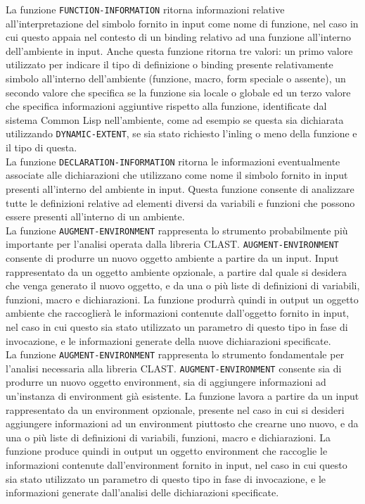 La funzione \texttt{FUNCTION-INFORMATION} ritorna informazioni relative
all’interpretazione del simbolo fornito in input come nome di funzione, nel caso
in cui questo appaia nel contesto di un binding relativo ad una funzione
all’interno dell’ambiente in input. Anche questa funzione ritorna tre valori: un
primo valore utilizzato per indicare il tipo di definizione o binding presente
relativamente simbolo all’interno dell’ambiente (funzione, macro, form speciale
o assente), un secondo valore che specifica se la funzione sia locale o globale
ed un terzo valore che specifica informazioni aggiuntive rispetto alla funzione,
identificate dal sistema Common Lisp nell’ambiente, come ad esempio se questa
sia dichiarata utilizzando \texttt{DYNAMIC-EXTENT}, se sia stato richiesto
l’inling o meno della funzione e il tipo di questa.\\

La funzione \texttt{DECLARATION-INFORMATION} ritorna le informazioni
eventualmente associate alle dichiarazioni che utilizzano come nome il simbolo
fornito in input presenti all’interno del ambiente in input. Questa funzione
consente di analizzare tutte le definizioni relative ad elementi diversi da
variabili e funzioni che possono essere presenti all’interno di un ambiente.\\

La funzione \texttt{AUGMENT-ENVIRONMENT} rappresenta lo strumento probabilmente
più importante per l’analisi operata dalla libreria CLAST.
\texttt{AUGMENT-ENVIRONMENT} consente di produrre un nuovo oggetto ambiente a
partire da un input. Input  rappresentato da un oggetto ambiente opzionale, a
partire dal quale si desidera che venga generato il nuovo oggetto, e da una o
più liste di definizioni di variabili, funzioni, macro e dichiarazioni. La
funzione produrrà quindi in output un oggetto ambiente che raccoglierà le
informazioni contenute dall'oggetto fornito in input, nel caso in cui questo sia
stato utilizzato un parametro di questo tipo in fase di invocazione, e le
informazioni generate della nuove dichiarazioni specificate.\\

La funzione \texttt{AUGMENT-ENVIRONMENT} rappresenta lo strumento fondamentale
per l’analisi necessaria alla libreria CLAST. \texttt{AUGMENT-ENVIRONMENT}
consente sia di produrre un nuovo oggetto environment, sia di aggiungere
informazioni ad un'instanza di environment già esistente. La funzione lavora a
partire da un input rappresentato da un environment opzionale, presente nel
caso in cui si desideri aggiungere informazioni ad un environment piuttosto
che crearne uno nuovo, e da una o più liste di definizioni di variabili,
funzioni, macro e dichiarazioni. La funzione produce quindi in output un
oggetto environment che raccoglie le informazioni contenute dall'environment
fornito in input, nel caso in cui questo sia stato utilizzato un parametro di
questo tipo in fase di invocazione, e le informazioni generate dall'analisi
delle dichiarazioni specificate.\\

